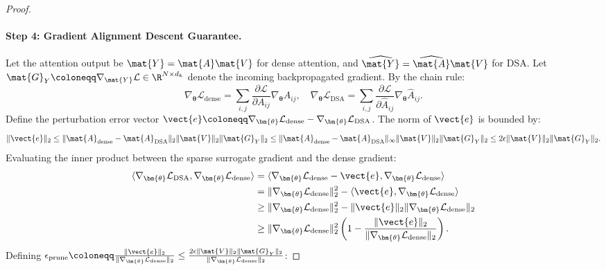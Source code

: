 \begin{proof}
\paragraph{Step 4: Gradient Alignment Descent Guarantee.}
Let the attention output be $\mat{Y} = \mat{A} \mat{V}$ for dense attention, and $\widehat{\mat{Y}} = \widehat{\mat{A}} \mat{V}$ for DSA.
Let $\mat{G}_Y \coloneqq \nabla_{\mat{Y}} \mathcal{L} \in \R^{N \times d_k}$ denote the incoming backpropagated gradient.
By the chain rule:
\begin{equation}
\nabla_{\bm{\theta}} \mathcal{L}_{\text{dense}} = \sum_{i,j} \frac{\partial \mathcal{L}}{\partial A_{ij}} \nabla_{\bm{\theta}} A_{ij}, \quad \nabla_{\bm{\theta}} \mathcal{L}_{\text{DSA}} = \sum_{i,j} \frac{\partial \mathcal{L}}{\partial \widehat{A}_{ij}} \nabla_{\bm{\theta}} \widehat{A}_{ij}.
\end{equation}
Define the perturbation error vector $\vect{e} \coloneqq \nabla_{\bm{\theta}} \mathcal{L}_{\text{dense}} - \nabla_{\bm{\theta}} \mathcal{L}_{\text{DSA}}$.
The norm of $\vect{e}$ is bounded by:
\begin{equation}
\|\vect{e}\|_2 \le \|\mat{A}_{\text{dense}} - \mat{A}_{\text{DSA}}\|_2 \|\mat{V}\|_2 \|\mat{G}_Y\|_2 \le \|\mat{A}_{\text{dense}} - \mat{A}_{\text{DSA}}\|_\infty \|\mat{V}\|_2 \|\mat{G}_Y\|_2 \le 2 \epsilon \|\mat{V}\|_2 \|\mat{G}_Y\|_2.
\end{equation}
Evaluating the inner product between the sparse surrogate gradient and the dense gradient:
\begin{align}
\langle \nabla_{\bm{\theta}} \mathcal{L}_{\text{DSA}}, \nabla_{\bm{\theta}} \mathcal{L}_{\text{dense}} \rangle &= \langle \nabla_{\bm{\theta}} \mathcal{L}_{\text{dense}} - \vect{e}, \nabla_{\bm{\theta}} \mathcal{L}_{\text{dense}} \rangle \nonumber \\
&= \|\nabla_{\bm{\theta}} \mathcal{L}_{\text{dense}}\|_2^2 - \langle \vect{e}, \nabla_{\bm{\theta}} \mathcal{L}_{\text{dense}} \rangle \nonumber \\
&\ge \|\nabla_{\bm{\theta}} \mathcal{L}_{\text{dense}}\|_2^2 - \|\vect{e}\|_2 \|\nabla_{\bm{\theta}} \mathcal{L}_{\text{dense}}\|_2 \nonumber \\
&\ge \|\nabla_{\bm{\theta}} \mathcal{L}_{\text{dense}}\|_2^2 \left( 1 - \frac{\|\vect{e}\|_2}{\|\nabla_{\bm{\theta}} \mathcal{L}_{\text{dense}}\|_2} \right).
\end{align}
Defining $\epsilon_{\text{prune}} \coloneqq \frac{\|\vect{e}\|_2}{\|\nabla_{\bm{\theta}} \mathcal{L}_{\text{dense}}\|_2} \le \frac{2 \epsilon \|\mat{V}\|_2 \|\mat{G}_Y\|_2}{\|\nabla_{\bm{\theta}} \mathcal{L}_{\text{dense}}\|_2}$:

\end{proof}
